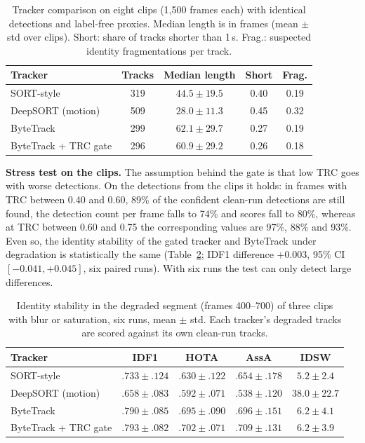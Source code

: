 \documentclass[journal]{IEEEtran}
\begin{document}
\begin{table}[!t]
\centering
\caption{Tracker comparison on eight clips (1,500 frames each) with identical detections and label-free proxies. Median length is in frames (mean $\pm$ std over clips). Short: share of tracks shorter than 1\,s. Frag.: suspected identity fragmentations per track.}
\label{tab:real}
\footnotesize
\setlength{\tabcolsep}{3pt}
\begin{tabular}{@{}lcccc@{}}
\toprule
Tracker & Tracks & Median length & Short & Frag. \\
\midrule
SORT-style & 319 & $44.5\pm19.5$ & 0.40 & 0.19 \\
DeepSORT (motion) & 509 & $28.0\pm11.3$ & 0.45 & 0.32 \\
ByteTrack & 299 & $62.1\pm29.7$ & 0.27 & 0.19 \\
ByteTrack + TRC gate & 296 & $60.9\pm29.2$ & 0.26 & 0.18 \\
\bottomrule
\end{tabular}
\end{table}

\textbf{Stress test on the clips.} The assumption behind the gate is that low TRC goes with worse detections. On the detections from the clips it holds: in frames with TRC between 0.40 and 0.60, 89\% of the confident clean-run detections are still found, the detection count per frame falls to 74\% and scores fall to 80\%, whereas at TRC between 0.60 and 0.75 the corresponding values are 97\%, 88\% and 93\%. Even so, the identity stability of the gated tracker and ByteTrack under degradation is statistically the same (Table~\ref{tab:stress}; IDF1 difference $+0.003$, 95\% CI $[-0.041,+0.045]$, six paired runs). With six runs the test can only detect large differences.

\begin{table}[!t]
\centering
\caption{Identity stability in the degraded segment (frames 400--700) of three clips with blur or saturation, six runs, mean $\pm$ std. Each tracker's degraded tracks are scored against its own clean-run tracks.}
\label{tab:stress}
\scriptsize
\setlength{\tabcolsep}{2pt}
\begin{tabular}{@{}lcccc@{}}
\toprule
Tracker & IDF1 & HOTA & AssA & IDSW \\
\midrule
SORT-style & $.733\pm.124$ & $.630\pm.122$ & $.654\pm.178$ & $5.2\pm2.4$ \\
DeepSORT (motion) & $.658\pm.083$ & $.592\pm.071$ & $.538\pm.120$ & $38.0\pm22.7$ \\
ByteTrack & $.790\pm.085$ & $.695\pm.090$ & $.696\pm.151$ & $6.2\pm4.1$ \\
ByteTrack + TRC gate & $.793\pm.082$ & $.702\pm.071$ & $.709\pm.131$ & $6.2\pm3.9$ \\
\bottomrule
\end{tabular}
\end{table}
\end{document}
